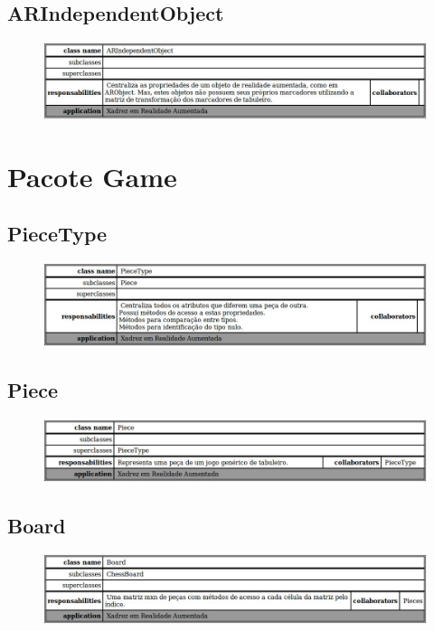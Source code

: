 \documentclass[a4paper,12pt]{book}
\begin{document}
    \subsection{ARIndependentObject}
    \label{subsec:crcarindependentobject}
    \begin{figure}[H]
	  \centering
	  \includegraphics[width=1.0\textwidth]{crc/ARIndependentObject}
	  \end{figure}
  \section{Pacote Game}
  \label{sec:crcpacotegame}
    \subsection{PieceType}
    \label{subsec:crcpiecetype}
    \begin{figure}[H]
	  \centering
	  \includegraphics[width=1.0\textwidth]{crc/PieceType}
	  \end{figure}
    \subsection{Piece}
    \label{subsec:crcpiece}
    \begin{figure}[H]
	  \centering
	  \includegraphics[width=1.0\textwidth]{crc/Piece}
	  \end{figure}
    \subsection{Board}
    \label{subsec:crcboard}
    \begin{figure}[H]
	  \centering
	  \includegraphics[width=1.0\textwidth]{crc/Board}
	  \end{figure}
\end{document}
